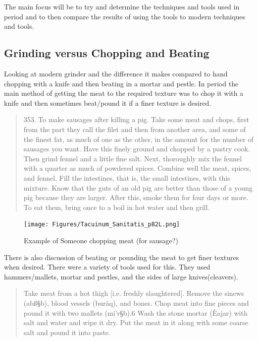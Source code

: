 \documentclass[letterpaper,11pt,leqno]{article}
\begin{document}
The main focus will be to try and determine the techniques and tools used in period and to then compare the results of using the tools to modern techniques and tools.

\subsection{Grinding versus Chopping and Beating}

 Looking at modern grinder and the difference it makes compared to hand chopping with a knife and then beating in a mortar and pestle. In period the main method of getting the meat to the required texture was to chop it with a knife and then sometimes beat/pound it if a finer texture is desired.
 
 \begin{quote}
 	353. To make sausages after killing a pig. Take some meat and chops, first from the part they call the filet and then from another area, and some of the finest fat, as much of one as the other, in the amount for the number of sausages you want. Have this finely ground and chopped by a pastry cook. Then grind fennel and a little fine salt. Next, thoroughly mix the fennel with a quarter as much of powdered spices. Combine well the meat, spices, and fennel. Fill the intestines, that is, the small intestines, with this mixture. Know that the guts of an old pig are better than those of a young pig because they are larger. After this, smoke them for four days or more. To eat them, bring once to a boil in hot water and then grill. \citep{goodWife}
 \end{quote} 
 
 \begin{figure}[p]
 	\centering
 	\texttt{[image: Figures/Tacuinum\_Sanitatis\_p82L.png]}
 	\caption{Example of Someone chopping meat (for sausage?)\citep{TacSan}}
 	\label{plot}
 \end{figure}
 
 
 There is also discussion of beating or pounding the meat to get finer textures when desired. There were a variety of tools used for this. They used hammers/mallets, mortar and pestles, and the sides of large knives(cleavers).
 
 \begin{quote}
 	Take meat from a hot thigh [i.e. freshly slaughtered]. Remove the sinews (abß§b), blood vessels (buråq), and bones. Chop meat into fine pieces and pound it with two mallets (mi'r§b).6 Wash the stone mortar (Èajar) with salt and water and wipe it dry. Put the meat in it along with some coarse salt and pound it into paste. \cite{al2007annals}
 \end{quote}
\end{document}
